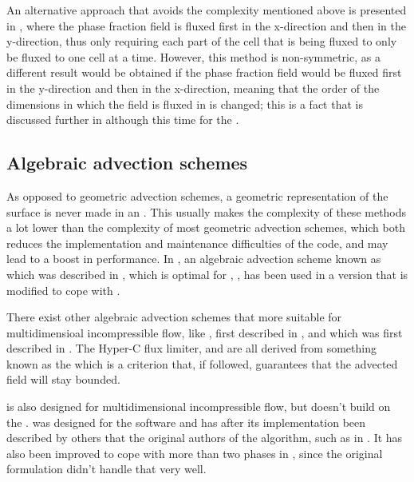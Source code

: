 An alternative approach that avoids the complexity mentioned above is presented in \citep{Aulisa2003}, where the phase fraction field is fluxed first in the x-direction and then in the y-direction, thus only requiring each part of the cell that is being fluxed to only be fluxed to one cell at a time. However, this method is non-symmetric, as a different result would be obtained if the phase fraction field would be fluxed first in the y-direction and then in the x-direction, meaning that the order of the dimensions in which the field is fluxed in is changed; this is a fact that is discussed further in \citep{Ubbink1999} although this time for the  .

\subsection{Algebraic advection schemes}

As opposed to geometric advection schemes, a geometric representation of the surface is never made in an . This usually makes the complexity of these methods a lot lower than the complexity of most geometric advection schemes, which both reduces the implementation and maintenance difficulties of the code, and may lead to a boost in performance. In \thisprojectwork, an algebraic advection scheme known as  which was described in \citep{Leonard1988}, which is optimal for , , has been used in a version that is modified to cope with .

There exist other algebraic advection schemes that more suitable for multidimensioal incompressible flow, like \CICSAM, first described in \citep{Ubbink1999}, and \STACS which was first described in \citep{Darwish}. The Hyper-C flux limiter, \CICSAM and \STACS are all derived from something known as the \CBC which is a criterion that, if followed, guarantees that the advected field will stay bounded.

\MULES is also designed for multidimensional incompressible flow, but doesn't build on the \CBC. \MULES was designed for the  software  and has after its implementation been described by others that the original authors of the algorithm, such as in \citep{Berberovi2009}. It has also been improved to cope with more than two phases in \citep{Kissling2010}, since the original formulation didn't handle that very well.

